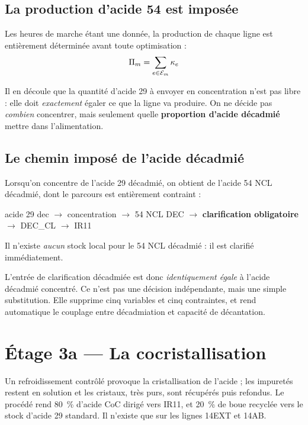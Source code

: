 \subsection{La production d'acide 54 est imposée}

Les heures de marche étant une donnée, la production de chaque ligne est entièrement
déterminée avant toute optimisation :
\begin{equation}
\Pi_m = \sum_{e \in \mathcal{E}_m} \kappa_e
\end{equation}

Il en découle que la quantité d'acide 29 à envoyer en concentration n'est pas libre : elle
doit \emph{exactement} égaler ce que la ligne va produire. On ne décide pas \emph{combien}
concentrer, mais seulement quelle \textbf{proportion d'acide décadmié} mettre dans
l'alimentation.

\subsection{Le chemin imposé de l'acide décadmié}

Lorsqu'on concentre de l'acide 29 décadmié, on obtient de l'acide 54 NCL décadmié, dont le
parcours est entièrement contraint :

\begin{center}
\small
acide 29 dec $\longrightarrow$ concentration $\longrightarrow$ 54 NCL DEC
$\longrightarrow$ \textbf{clarification obligatoire} $\longrightarrow$ DEC\_CL
$\longrightarrow$ IR11
\end{center}

Il n'existe \emph{aucun} stock local pour le 54 NCL décadmié : il est clarifié
immédiatement.

\begin{encadre}[title={Une simplification élégante}]
L'entrée de clarification décadmiée est donc \emph{identiquement égale} à l'acide décadmié
concentré. Ce n'est pas une décision indépendante, mais une simple substitution. Elle
supprime cinq variables et cinq contraintes, et rend automatique le couplage entre
décadmiation et capacité de décantation.
\end{encadre}

\section{Étage 3a --- La cocristallisation}

Un refroidissement contrôlé provoque la cristallisation de l'acide ; les impuretés restent
en solution et les cristaux, très purs, sont récupérés puis refondus. Le procédé rend
\SI{80}{\percent} d'acide CoC dirigé vers IR11, et \SI{20}{\percent} de boue recyclée vers le
stock d'acide 29 standard. Il n'existe que sur les lignes 14EXT et 14AB.

